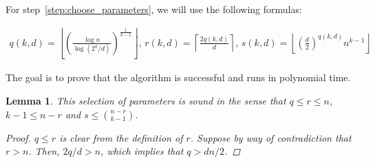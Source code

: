 \documentclass[12pt]{article}
\newtheorem{lemma}[thm]{Lemma}
\begin{document}
    For step~\ref{step:choose_parameters}, we will use the following formulas:

    \begin{align*}
            q(k, d) = \left\lfloor \left(  \frac{\log n}{\log (2^k/d)} \right)^{\frac{1}{k-1}} \right\rfloor,\,
            r(k, d) = \left \lceil \frac{2q(k, d)}{d} \right \rceil,\,
            s(k, d) = \left\lfloor \left( \frac{d}{2} \right)^{q(k, d)} n^{k-1} \right\rfloor
    \end{align*}

    The goal is to prove that the algorithm is successful and runs in polynomial time.

    \begin{lemma}
        This selection of parameters is sound in the sense that $q  \leq r \leq n$, $k - 1 \leq n - r$ and $s \leq \binom{n - r}{k - 1}$.

        \begin{proof}
            $q \leq r$ is clear from the definition of $r$.
            Suppose by way of contradiction that $r > n$.
            Then, $2q/d > n$, which implies that $q > dn/2$.
        \end{proof}

    \end{lemma}
\end{document}
